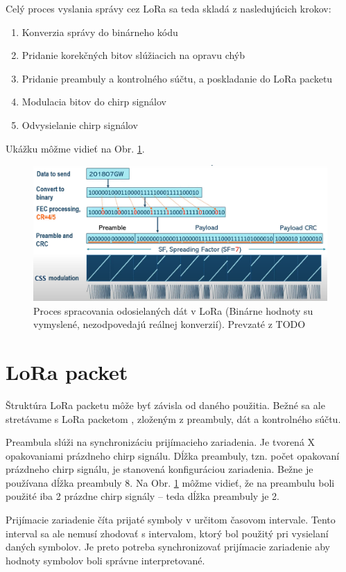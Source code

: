 \documentclass[slovak,master]{diploma}
\begin{document}
Celý proces vyslania správy cez LoRa sa teda skladá z nasledujúcich krokov:
\begin{enumerate}
  \item Konverzia správy do binárneho kódu
  \item Pridanie korekčných bitov slúžiacich na opravu chýb
  \item Pridanie preambuly a kontrolného súčtu, a poskladanie do LoRa packetu
  \item Modulacia bitov do chirp signálov
  \item Odvysielanie chirp signálov
\end{enumerate}
Ukážku môžme vidieť na Obr. \ref{fig:loraModulation}.

\begin{figure}
	\centering
	\includegraphics[width=1\textwidth]{Figures/loraModulation2.png}
	\caption{Proces spracovania odosielaných dát v LoRa (Binárne hodnoty su vymyslené, nezodpovedajú reálnej konverzií). Prevzaté z TODO}
	\label{fig:loraModulation}
\end{figure}

\section{LoRa packet}
Štruktúra LoRa packetu môže byť závisla od daného použitia. Bežné sa ale stretávame s LoRa packetom 
, zloženým z preambuly, dát a kontrolného súčtu.

Preambula slúži na synchronizáciu prijímacieho zariadenia. Je tvorená X opakovaniami prázdneho chirp signálu.
Dĺžka preambuly, tzn. počet opakovaní prázdneho chirp signálu, je stanovená konfiguráciou zariadenia. Bežne je používana dĺžka preambuly 8.
Na Obr. \ref{fig:loraModulation} môžme vidieť, že na preambulu boli použité iba 2 prázdne chirp signály -- teda dĺžka preambuly je 2.

Prijímacie zariadenie číta prijaté symboly v určitom časovom intervale. Tento interval sa ale nemusí zhodovať s intervalom, ktorý bol použitý pri vysielaní daných symbolov.
Je preto potreba synchronizovať prijímacie zariadenie aby hodnoty symbolov boli správne interpretované.
\end{document}
